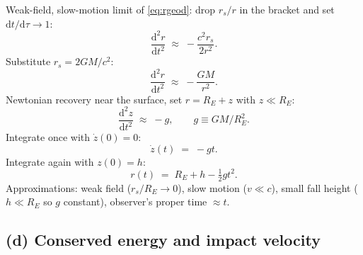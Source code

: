 \documentclass[11pt]{article}
\newcommand{\de}{\mathrm{d}}
\begin{document}
Weak-field, slow-motion limit of \eqref{eq:rgeod}: drop $r_s/r$ in the bracket and set $\de t/\de\tau\to 1$:
\[
\frac{\de^2 r}{\de t^2} \;\approx\; -\frac{c^2 r_s}{2 r^2}.
\]
Substitute $r_s=2GM/c^2$:
\[
\frac{\de^2 r}{\de t^2} \;\approx\; -\frac{GM}{r^2}.
\]
Newtonian recovery near the surface, set $r=R_E+z$ with $z\ll R_E$:
\[
\frac{\de^2 z}{\de t^2} \;\approx\; -g,\qquad g\equiv GM/R_E^2.
\]
Integrate once with $\dot z(0)=0$:
\[
\dot z(t) \;=\; -g t.
\]
Integrate again with $z(0)=h$:
\begin{equation}
\boxed{\;r(t) \;=\; R_E + h - \tfrac{1}{2}g t^2.\;}
\label{eq:rt}
\end{equation}
Approximations: weak field ($r_s/R_E\to 0$), slow motion ($v\ll c$), small fall height ($h\ll R_E$ so $g$ constant), observer's proper time $\approx t$.

\subsection*{(d) Conserved energy and impact velocity}
\end{document}
